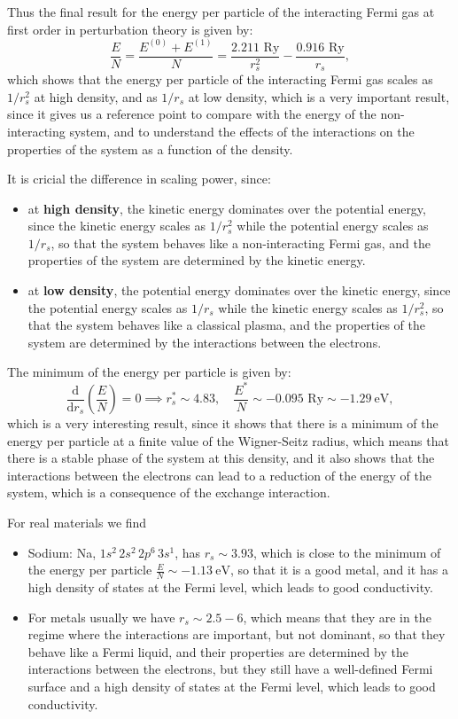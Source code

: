 Thus the final result for the energy per particle of the interacting Fermi gas at first order in perturbation theory is given by:
\[
    \frac{E}{N} = \frac{E^{(0)} + E^{(1)}}{N} = \frac{2.211 \text{ Ry}}{r_s^2} - \frac{0.916 \text{ Ry}}{r_s},
\]
which shows that the energy per particle of the interacting Fermi gas scales as \(1/r_s^2\) at high density, and as \(1/r_s\) at low density, which is a very important result, since it gives us a reference point to compare with the energy of the non-interacting system, and to understand the effects of the interactions on the properties of the system as a function of the density.

It is cricial the difference in scaling power, since:
\begin{itemize}
    \item at \textbf{high density}, the kinetic energy dominates over the potential energy, since the kinetic energy scales as \(1/r_s^2\) while the potential energy scales as \(1/r_s\), so that the system behaves like a non-interacting Fermi gas, and the properties of the system are determined by the kinetic energy.
    \item at \textbf{low density}, the potential energy dominates over the kinetic energy, since the potential energy scales as \(1/r_s\) while the kinetic energy scales as \(1/r_s^2\), so that the system behaves like a classical plasma, and the properties of the system are determined by the interactions between the electrons.
\end{itemize}
The minimum of the energy per particle is given by:
\[
    \frac{\mathrm{d}}{\mathrm{d} r_s} \left( \frac{E}{N} \right) = 0 \implies r_s^* \sim 4.83, \quad \frac{E^*}{N} \sim - 0.095 \text{ Ry} \sim -\SI{1.29}{\electronvolt},
\]
which is a very interesting result, since it shows that there is a minimum of the energy per particle at a finite value of the Wigner-Seitz radius, which means that there is a stable phase of the system at this density, and it also shows that the interactions between the electrons can lead to a reduction of the energy of the system, which is a consequence of the exchange interaction.

For real materials we find
\begin{itemize}
    \item Sodium: Na, \(1s^2 \, 2s^2 \, 2p^6 \, 3s^1\), has \(r_s \sim 3.93\), which is close to the minimum of the energy per particle \(\frac{E}{N} \sim - \SI{1.13}{\electronvolt}\), so that it is a good metal, and it has a high density of states at the Fermi level, which leads to good conductivity.
    \item For metals usually we have \(r_s \sim 2.5 - 6\), which means that they are in the regime where the interactions are important, but not dominant, so that they behave like a Fermi liquid, and their properties are determined by the interactions between the electrons, but they still have a well-defined Fermi surface and a high density of states at the Fermi level, which leads to good conductivity.
\end{itemize}

